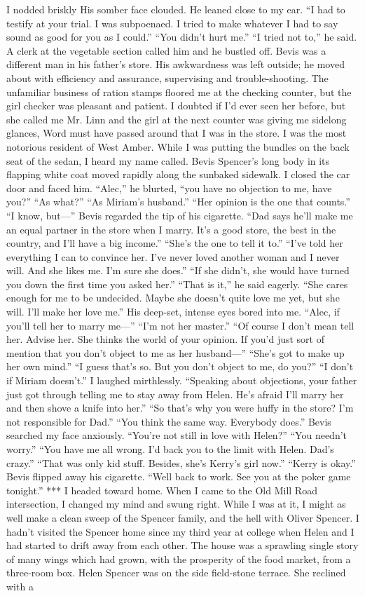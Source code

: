 \documentclass{novel}
\begin{document}
I nodded briskly His somber face clouded. He leaned close to my ear. “I had to testify at your trial. I was subpoenaed. I tried to make whatever I had to say sound as good for you as I could.” “You didn’t hurt me.” “I tried not to,” he said. A clerk at the vegetable section called him and he bustled off. Bevis was a different man in his father’s store. His awkwardness was left outside; he moved about with efficiency and assurance, supervising and trouble-shooting. The unfamiliar business of ration stamps floored me at the checking counter, but the girl checker was pleasant and patient. I doubted if I’d ever seen her before, but she called me Mr. Linn and the girl at the next counter was giving me sidelong glances, Word must have passed around that I was in the store. I was the most notorious resident of West Amber. While I was putting the bundles on the back seat of the sedan, I heard my name called. Bevis Spencer’s long body in its flapping white coat moved rapidly along the sunbaked sidewalk. I closed the car door and faced him. “Alec,” he blurted, “you have no objection to me, have you?” “As what?” “As Miriam’s husband.” “Her opinion is the one that counts.” “I know, but—” Bevis regarded the tip of his cigarette. “Dad says he’ll make me an equal partner in the store when I marry. It’s a good store, the best in the country, and I’ll have a big income.” “She’s the one to tell it to.” “I’ve told her everything I can to convince her. I’ve never loved another woman and I never will. And she likes me. I’m sure she does.” “If she didn’t, she would have turned you down the first time you asked her.” “That is it,” he said eagerly. “She cares enough for me to be undecided. Maybe she doesn’t quite love me yet, but she will. I’ll make her love me.” His deep-set, intense eyes bored into me. “Alec, if you’ll tell her to marry me—” “I’m not her master.” “Of course I don’t mean tell her. Advise her. She thinks the world of your opinion. If you’d just sort of mention that you don’t object to me as her husband—” “She’s got to make up her own mind.” “I guess that’s so. But you don’t object to me, do you?” “I don’t if Miriam doesn’t.” I laughed mirthlessly. “Speaking about objections, your father just got through telling me to stay away from Helen. He’s afraid I’ll marry her and then shove a knife into her.” “So that’s why you were huffy in the store? I’m not responsible for Dad.” “You think the same way. Everybody does.” Bevis searched my face anxiously. “You’re not still in love with Helen?” “You needn’t worry.” “You have me all wrong. I’d back you to the limit with Helen. Dad’s crazy.” “That was only kid stuff. Besides, she’s Kerry’s girl now.” “Kerry is okay.” Bevis flipped away his cigarette. “Well back to work. See you at the poker game tonight.” *** I headed toward home. When I came to the Old Mill Road intersection, I changed my mind and swung right. While I was at it, I might as well make a clean sweep of the Spencer family, and the hell with Oliver Spencer. I hadn’t visited the Spencer home since my third year at college when Helen and I had started to drift away from each other. The house was a sprawling single story of many wings which had grown, with the prosperity of the food market, from a three-room box. Helen Spencer was on the side field-stone terrace. She reclined with a 
\end{document}
